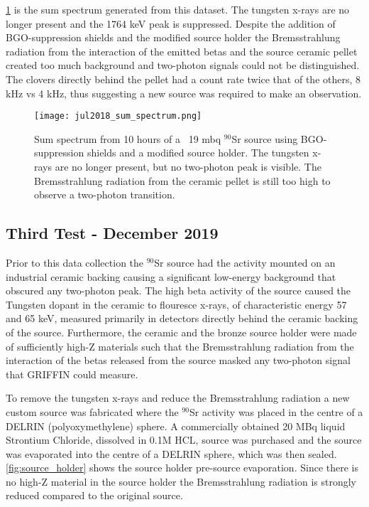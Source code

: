 \documentclass[cnatzke_thesis_proposal.tex]{subfiles}
\begin{document}
\ref{fig:sum_spectrum_jul2018} is the sum spectrum generated from this dataset. 
The tungsten x-rays are no longer present and the 1764 keV peak is suppressed. 
Despite the addition of BGO-suppression shields and the modified source holder the Bremsstrahlung radiation from the interaction of the emitted betas and the source ceramic pellet created too much background and two-photon signals could not be distinguished.
The clovers directly behind the pellet had a count rate twice that of the others, 8 kHz vs 4 kHz, thus suggesting a new source was required to make an observation.

\begin{figure}[htbp]
  \centering
  \texttt{[image: jul2018\_sum\_spectrum.png]}
  \caption{Sum spectrum from 10 hours of a ~19 mbq $^{90}$Sr source using BGO-suppression shields and a modified source holder. The tungsten x-rays are no longer present, but no two-photon peak is visible. The Bremsstrahlung radiation from the ceramic pellet is still too high to observe a two-photon transition.}
  \label{fig:sum_spectrum_jul2018}
\end{figure}

\subsection{Third Test - December 2019}

Prior to this data collection the $^{90}$Sr source had the activity mounted on an industrial ceramic backing causing a significant low-energy background that obscured any two-photon peak.
The high beta activity of the source caused the Tungsten dopant in the ceramic to flouresce x-rays, of characteristic energy 57 and 65 keV, measured primarily in detectors directly behind the ceramic backing of the source.
Furthermore, the ceramic and the bronze source holder were made of sufficiently high-Z materials such that the Bremsstrahlung radiation from the interaction of the betas released from the source masked any two-photon signal that GRIFFIN could measure.

To remove the tungsten x-rays and reduce the Bremsstrahlung radiation a new custom source was fabricated where the $^{90}$Sr activity was placed in the centre of a DELRIN (polyoxymethylene) sphere.
A commercially obtained 20 MBq liquid Strontium Chloride, dissolved in 0.1M HCL, source was purchased and the source was evaporated into the centre of a DELRIN sphere, which was then sealed.
\ref{fig:source_holder} shows the source holder pre-source evaporation.
Since there is no high-Z material in the source holder the Bremsstrahlung radiation is strongly reduced compared to the original source.
\end{document}

